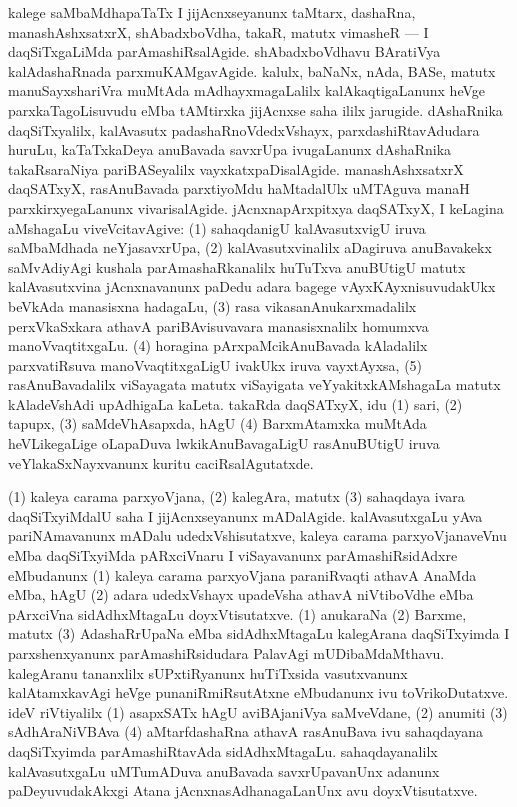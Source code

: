 kalege saMbaMdhapaTaTx I jijAcnxseyanunx taMtarx, dashaRna, manashAshxsatxrX, shAbadxboVdha, takaR, matutx vimasheR --- I daqSiTxgaLiMda parAmashiRsalAgide. shAbadxboVdhavu BAratiVya kalAdashaRnada parxmuKAMgavAgide. kalulx, baNaNx, nAda, BASe, matutx manuSayxshariVra muMtAda mAdhayxmagaLalilx kalAkaqtigaLanunx heVge parxkaTagoLisuvudu eMba tAMtirxka jijAcnxse saha ililx jarugide. dAshaRnika daqSiTxyalilx, kalAvasutx padashaRnoVdedxVshayx, parxdashiRtavAdudara huruLu, kaTaTxkaDeya anuBavada savxrUpa ivugaLanunx dAshaRnika takaRsaraNiya pariBASeyalilx vayxkatxpaDisalAgide. manashAshxsatxrX daqSATxyX, rasAnuBavada parxtiyoMdu haMtadalUlx uMTAguva manaH parxkirxyegaLanunx vivarisalAgide. jAcnxnapArxpitxya daqSATxyX, I keLagina aMshagaLu viveVcitavAgive: (1) sahaqdanigU kalAvasutxvigU iruva saMbaMdhada neYjasavxrUpa, (2) kalAvasutxvinalilx aDagiruva anuBavakekx saMvAdiyAgi kushala parAmashaRkanalilx huTuTxva anuBUtigU matutx kalAvasutxvina jAcnxnavanunx paDedu adara bagege vAyxKAyxnisuvudakUkx beVkAda manasisxna hadagaLu, (3) rasa vikasanAnukarxmadalilx perxVkaSxkara athavA pariBAvisuvavara manasisxnalilx homumxva manoVvaqtitxgaLu. (4) horagina pArxpaMcikAnuBavada kAladalilx parxvatiRsuva manoVvaqtitxgaLigU ivakUkx iruva vayxtAyxsa, (5) rasAnuBavadalilx viSayagata matutx viSayigata veYyakitxkAMshagaLa matutx kAladeVshAdi upAdhigaLa kaLeta. takaRda daqSATxyX, idu (1) sari, (2) tapupx, (3) saMdeVhAsapxda, hAgU (4) BarxmAtamxka muMtAda heVLikegaLige oLapaDuva lwkikAnuBavagaLigU rasAnuBUtigU iruva veYlakaSxNayxvanunx kuritu caciRsalAgutatxde.

(1) kaleya carama parxyoVjana, (2) kalegAra, matutx (3) sahaqdaya ivara daqSiTxyiMdalU saha I jijAcnxseyanunx mADalAgide. kalAvasutxgaLu yAva pariNAmavanunx mADalu udedxVshisutatxve, kaleya carama parxyoVjanaveVnu eMba daqSiTxyiMda pARxciVnaru I viSayavanunx parAmashiRsidAdxre eMbudanunx (1) kaleya carama parxyoVjana paraniRvaqti athavA AnaMda eMba, hAgU (2) adara udedxVshayx upadeVsha athavA niVtiboVdhe eMba pArxciVna sidAdhxMtagaLu doyxVtisutatxve. (1) anukaraNa (2) Barxme, matutx (3) AdashaRrUpaNa eMba sidAdhxMtagaLu kalegArana daqSiTxyimda I parxshenxyanunx parAmashiRsidudara PalavAgi mUDibaMdaMthavu. kalegAranu tananxlilx sUPxtiRyanunx huTiTxsida vasutxvanunx kalAtamxkavAgi heVge punaniRmiRsutAtxne eMbudanunx ivu toVrikoDutatxve. ideV riVtiyalilx (1) asapxSATx hAgU aviBAjaniVya saMveVdane, (2) anumiti (3) sAdhAraNiVBAva (4) aMtarfdashaRna athavA rasAnuBava ivu sahaqdayana daqSiTxyimda parAmashiRtavAda sidAdhxMtagaLu. sahaqdayanalilx kalAvasutxgaLu uMTumADuva anuBavada savxrUpavanUnx adanunx paDeyuvudakAkxgi Atana jAcnxnasAdhanagaLanUnx avu doyxVtisutatxve.

